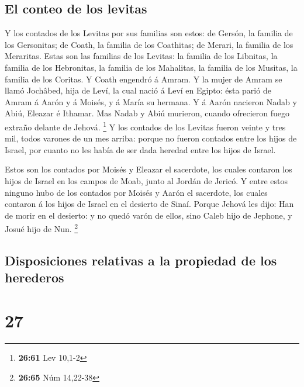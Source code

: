 \hypertarget{el-conteo-de-los-levitas}{%
\subsection{El conteo de los levitas}\label{el-conteo-de-los-levitas}}

 Y los contados de los Levitas por sus familias son
estos: de Gersón, la familia de los Gersonitas; de Coath, la familia de
los Coathitas; de Merari, la familia de los Meraritas. 
Estas son las familias de los Levitas: la familia de los Libnitas, la
familia de los Hebronitas, la familia de los Mahalitas, la familia de
los Musitas, la familia de los Coritas. Y Coath engendró á Amram.
 Y la mujer de Amram se llamó Jochâbed, hija de Leví, la
cual nació á Leví en Egipto: ésta parió de Amram á Aarón y á Moisés, y á
María su hermana.  Y á Aarón nacieron Nadab y Abiú,
Eleazar é Ithamar.  Mas Nadab y Abiú murieron, cuando
ofrecieron fuego extraño delante de Jehová. \footnote{\textbf{26:61} Lev
  10,1-2}  Y los contados de los Levitas fueron veinte y
tres mil, todos varones de un mes arriba: porque no fueron contados
entre los hijos de Israel, por cuanto no les había de ser dada heredad
entre los hijos de Israel.

 Estos son los contados por Moisés y Eleazar el
sacerdote, los cuales contaron los hijos de Israel en los campos de
Moab, junto al Jordán de Jericó.  Y entre estos ninguno
hubo de los contados por Moisés y Aarón el sacerdote, los cuales
contaron á los hijos de Israel en el desierto de Sinaí. 
Porque Jehová les dijo: Han de morir en el desierto: y no quedó varón de
ellos, sino Caleb hijo de Jephone, y Josué hijo de Nun. \footnote{\textbf{26:65}
  Núm 14,22-38}

\hypertarget{disposiciones-relativas-a-la-propiedad-de-los-herederos}{%
\subsection{Disposiciones relativas a la propiedad de los
herederos}\label{disposiciones-relativas-a-la-propiedad-de-los-herederos}}

\hypertarget{section-26}{%
\section{27}\label{section-26}}

